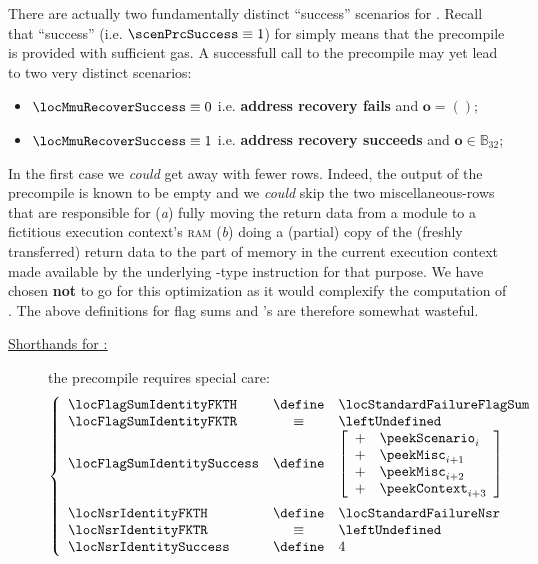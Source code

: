 \saNote{}
There are actually two fundamentally distinct ``success'' scenarios for \instEcrecover{}.
Recall that ``success'' (i.e. $\scenPrcSuccess \equiv 1$) for \instEcrecover{} simply means that the precompile is provided with sufficient gas.
A successfull call to the \instEcrecover{} precompile may yet lead to two very distinct scenarios:
\begin{itemize}
	\item $\locMmuRecoverSuccess \equiv 0$ i.e. \textbf{address recovery fails}    and $\textbf{o} = ()$;
	\item $\locMmuRecoverSuccess \equiv 1$ i.e. \textbf{address recovery succeeds} and $\textbf{o} \in \mathbb{B}_{32}$;
\end{itemize}
In the first case we \emph{could} get away with fewer rows.
Indeed, the output of the precompile  is known to be empty and we \emph{could} skip the two miscellaneous-rows that are responsible for
(\emph{a}) fully moving the return data from a \ecDataMod{} module to a fictitious execution context's \textsc{ram}
(\emph{b}) doing a (partial) copy of the (freshly transferred) return data to the part of memory in the current execution context made available by the underlying -type instruction for that purpose.
We have chosen \textbf{not} to go for this optimization as it would complexify the computation of \nonStackRows{}. 
The above definitions for flag sums and 's are therefore somewhat wasteful.
\begin{description}
	\item[\underline{\underline{Shorthands for \instIdentity{}:}}] the \instIdentity{} precompile requires special care:
		\[
			\left\{ \begin{array}{lcl}
				\locFlagSumIdentityFKTH    & \define & \locStandardFailureFlagSum \\
				\locFlagSumIdentityFKTR    & \equiv  & \leftUndefined             \\
				\locFlagSumIdentitySuccess & \define &
				\left[ \begin{array}{cl}
					+ & \peekScenario  _{i    } \\ 
					+ & \peekMisc      _{i + 1} \\ 
					+ & \peekMisc      _{i + 2} \\ 
					+ & \peekContext   _{i + 3} \\ 
				\end{array} \right] \vspace{2mm} \\
				\locNsrIdentityFKTH    & \define & \locStandardFailureNsr \\
				\locNsrIdentityFKTR    & \equiv  & \leftUndefined         \\
				\locNsrIdentitySuccess & \define & 4                      \\
			\end{array} \right.
		\]
\end{description}
